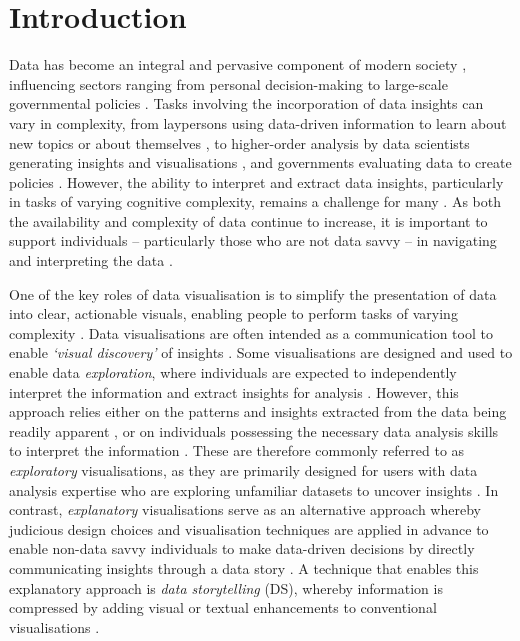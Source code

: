 \section{Introduction}
Data has become an integral and pervasive component of modern society \cite{dykes2020effective, Zhang2020dataquilt}, influencing sectors ranging from personal decision-making to large-scale governmental policies \cite{martinezmaldonado2020layeredstorytelling, Young-Ho2021, Loerakker2024, hwang2021evidence}. Tasks involving the incorporation of data insights can vary in complexity, from laypersons using data-driven information to learn about new topics \cite{Ferreira2021climate, Zhang2020dataquilt} or about themselves \cite{martinezmaldonado2020layeredstorytelling, Young-Ho2021, Loerakker2024, yen2020,mejia2023dashboards}, to higher-order analysis by data scientists generating insights and visualisations \cite{yang2022, lowe2020requirements}, and governments evaluating data to create policies \cite{hwang2021evidence}. However, the ability to interpret and extract data insights, particularly in tasks of varying cognitive complexity, remains a challenge for many \cite{shao2024datastorytelling, nobre2024, yang2022, ge2024}. As both the availability and complexity of data continue to increase, it is important to support individuals -- particularly those who are not data savvy -- in navigating and interpreting the data \cite{marriott2018immersive, ndukwe2020teaching}.

One of the key roles of data visualisation is to simplify the presentation of data into clear, actionable visuals, enabling people to perform tasks of varying complexity \cite{tufte2001visual}.
Data visualisations are often intended as a communication tool to enable \textit{‘visual discovery’} of insights \cite{ryan2016visual, Wang2020cheat}. Some visualisations are designed and used to enable data \textit{exploration}, where individuals are expected to independently interpret the information and extract insights for analysis \cite{yau2013datapoints, knaflic2015storytelling}. However, this approach relies either on the patterns and insights extracted from the data being readily apparent \cite{yau2013datapoints}, or on individuals possessing the necessary data analysis skills to interpret the information \cite{echeverria2018exploratory}. These are therefore commonly referred to as \textit{exploratory} visualisations, as they are primarily designed for users with data analysis expertise who are exploring unfamiliar datasets to uncover insights \cite{Kosara2013, bravo2020immersive, martinezmaldonado2020layeredstorytelling, iliinsky2011designing}.
In contrast, \textit{explanatory} visualisations serve as an alternative approach whereby judicious design choices and visualisation techniques are applied in advance to enable non-data savvy individuals to make data-driven decisions by directly communicating insights through a data story \cite{ryan2016visual, knaflic2015storytelling}. A technique that enables this explanatory approach is \textit{data storytelling} (DS), whereby information is compressed by adding visual or textual enhancements to conventional visualisations \cite{segel2010narrative, ryan2016visual, fernandeznieto2024editor}.

